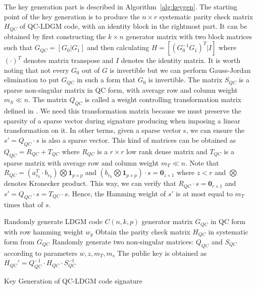 \documentclass[10pt,journal,compsoc]{IEEEtran}
\begin{document}
The key generation part is described in Algorithm~\ref{alg:keygen}. The starting point of the key generation is to produce
the $n\times r$ systematic parity check matrix $H_{QC}$ of QC-LDGM code, with an identity block in the rightmost part. It can be obtained by first constructing the $k\times n$ generator matrix with two block matrices such that $G_{QC} = [G_0|G_1]$ and then calculating $H=[(G_0^{-1}G_1)^T|I]$ where $(\cdot)^T$ denotes matrix transpose and $I$ denotes the identity matrix. It is worth noting that not every $G_0$ out of $G$ is invertible but we can perform Gauss-Jordan elimination to put $G_{QC}$ in such a form that $G_0$ is invertible. The matrix $S_{QC}$ is a sparse non-singular matrix in QC form, with average row and column weight $m_S \ll n$. The matrix $Q_{QC}$ is called a weight controlling transformation matrix defined in \cite{baldi2013using,baldi2016enhanced}. We need this transformation matrix because we must preserve the sparsity of a sparse vector during signature producing when imposing a linear transformation on it. In other terms, given a sparse vector s, we can ensure the $s'=Q_{QC}\cdot s$ is also a sparse vector. This kind of matrices can be obtained as $Q_{QC}=R_{QC}+T_{QC}$ where $R_{QC}$ is a $r\times r$ low rank dense matrix and $T_{QC}$ is a sparse matrix with average row and column weight $m_T \ll n$. Note that $R_{QC}=(a_{r_0}^T\cdot b_{r_0})\bigotimes \textbf{1}_{p\times p}$ and $(b_{r_0}\bigotimes \textbf{1}_{p\times p})\cdot s = \textbf{0}_{z\times 1}$ where $z < r$ and $\bigotimes$ denotes Kronecker product. This way, we can verify that $R_{QC}\cdot s = \textbf{0}_{r\times 1}$ and $s' = Q_{QC}\cdot s = T_{QC} \cdot s$. Hence, the Hamming weight of $s'$ is at most equal to $m_T$ times that of $s$.

\begin{algorithm}[h]	
	\DontPrintSemicolon %
    Randomly generate LDGM code $C(n,k,p)$ generator matrix $G_{QC}$ in QC form with row hamming weight $w_g$\;
	Obtain the parity check matrix $H_{QC}$ in systematic form from $G_{QC}$\;
    Randomly generate two non-singular matrices: $Q_{QC}$ and $S_{QC}$ according to parameters $w,z,m_T,m_s$ \;
    The public key is obtained as $H_{QC}' = Q_{QC}^{-1}\cdot H_{QC}\cdot S_{QC}^{-1}$\;
	\caption{Key Generation of QC-LDGM code signature}\label{alg:keygen}
\end{algorithm}
\end{document}

